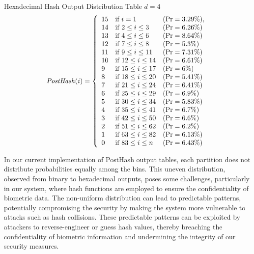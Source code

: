 Hexadecimal Hash Output Distribution Table \(d=4\)
{
\renewcommand{\arraystretch}{1.25}
\[
\text{\textit{PostHash}}(i) = \left\{
\begin{array}{lll}
    \text{15} & \text{if } i = 1 & (\text{Pr} = 3.29\%), \\
    \text{14} & \text{if } 2 \leq i \leq 3 & (\text{Pr} = 6.26\%) \\
    \text{13} & \text{if } 4 \leq i \leq 6 & (\text{Pr} = 8.64\%) \\
    \text{12} & \text{if } 7 \leq i \leq 8 & (\text{Pr} = 5.3\%) 
    \\
    \text{11} & \text{if } 9 \leq i \leq 11 & (\text{Pr} = 7.31\%) \\
    \text{10} & \text{if } 12 \leq i \leq 14 & (\text{Pr} = 6.61\%) \\
    \text{9} & \text{if } 15 \leq i \leq 17 & (\text{Pr} = 6\%) \\
    \text{8} & \text{if } 18 \leq i \leq 20 & (\text{Pr} = 5.41\%) \\
    \text{7} & \text{if } 21 \leq i \leq 24 & (\text{Pr} = 6.41\%) \\
    \text{6} & \text{if } 25 \leq i \leq 29 & (\text{Pr} = 6.9\%) \\
    \text{5} & \text{if } 30 \leq i \leq 34 & (\text{Pr} = 5.83\%) \\
    \text{4} & \text{if } 35 \leq i \leq 41 & (\text{Pr} = 6.7\%) \\
    \text{3} & \text{if } 42 \leq i \leq 50 & (\text{Pr} = 6.6\%) \\
    \text{2} & \text{if } 51 \leq i \leq 62 & (\text{Pr} = 6.2\%) \\
    \text{1} & \text{if } 63 \leq i \leq 82 & (\text{Pr} = 6.13\%) \\
    \text{0} & \text{if } 83 \leq i \leq n & (\text{Pr} = 6.43\%)
\end{array}
\right.
\]
}

In our current implementation of PostHash output tables, each partition does not distribute probabilities equally among the bins. This uneven distribution, observed from binary to hexadecimal outputs, poses some challenges, particularly in our system, where hash functions are employed to ensure the confidentiality of biometric data. The non-uniform distribution can lead to predictable patterns, potentially compromising the security by making the system more vulnerable to attacks such as hash collisions. These predictable patterns can be exploited by attackers to reverse-engineer or guess hash values, thereby breaching the confidentiality of biometric information and undermining the integrity of our security measures.

